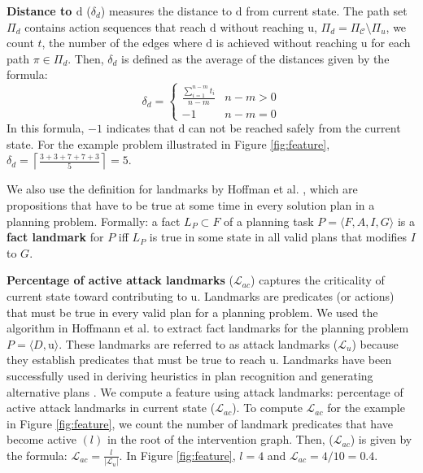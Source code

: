 \documentclass[letterpaper]{article}
\theoremstyle{plain}
\begin{document}
\textbf{Distance to $\boldsymbol{\mathrm{d}}$} ($\delta_d$) measures the distance to $\mathrm{d}$ from current state. The path set $\Pi_{d}$ contains action sequences that reach $\mathrm{d}$ without reaching $\mathrm{u}$, $\Pi_{d} = \Pi_{\mathcal{C}} \setminus \Pi_{u} $, we count  $t$, the number of the edges where $\mathrm{d}$ is achieved without reaching $\mathrm{u}$ for each path $\pi \in \Pi_{d}$. Then, $\delta_d$ is defined as the average of the distances given by the formula:
\begin{equation*} 
\delta_d = \left\{\begin{matrix}
\frac{\sum_{i=1}^{n-m}t_i}{n-m} & n-m>0\\ 
-1 &  n-m=0
\end{matrix}\right.
\end{equation*}
In this formula, $-1$ indicates that $\mathrm{d}$ can not be reached safely from the current state. For the example problem illustrated in Figure \ref{fig:feature}, $\delta_d=\left \lceil \frac{3+3+7+7+3}{5} \right \rceil=5$.


We also use the definition for landmarks by Hoffman et al. , which are propositions that have to be true at some time in every solution plan in a planning problem. Formally: a fact $L_P \subset F$ of a planning task $ P = \langle F, A, I, G \rangle$ is a \textbf{fact landmark} for $P$ iff $L_P$ is true in some state in all valid plans that modifies $I$ to $G$.

\textbf{Percentage of active attack landmarks} ($\mathcal{L}_{ac}$) captures the criticality of current state toward contributing to $\mathrm{u}$. 
Landmarks \cite{hoffman2004lm} are predicates (or actions) that must be true in every valid plan for a planning problem. We used the algorithm in Hoffmann et al.  to extract fact landmarks for the planning problem $P = \langle D, \mathrm{u}\rangle$. These landmarks are referred to as attack landmarks ($\mathcal{L}_{u}$) because they establish predicates that must be true to reach $\mathrm{u}$.  Landmarks have been successfully used in deriving heuristics in plan recognition \cite{vered2018goalrec} and generating alternative plans \cite{bryce2014diverse}. We compute a feature using attack landmarks: percentage of active attack landmarks in current state ($\mathcal{L}_{ac}$). To compute $\mathcal{L}_{ac}$ for the example in Figure \ref{fig:feature}, we count the number of landmark predicates that have become active $(l)$ in the root of the intervention graph. Then, ($\mathcal{L}_{ac}$) is given by the formula: $\mathcal{L}_{ac} = \frac{l}{\left |\mathcal{L}_{u}\right|}$. In Figure \ref{fig:feature}, $l=4$ and $\mathcal{L}_{ac}=4/10=0.4$.
\end{document}
